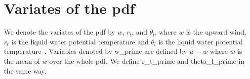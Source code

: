 \section{Variates of the pdf}\label{sec:variates-of-the-pdf}

We denote the variates of the \gls{pdf} by $w$, $r_t$, and $\theta_l$,
where $w$ is the upward wind, $r_t$ is the liquid water potential
temperature and $\theta_l$ is the liquid water potential temperature~\autocite[p. 10]{larson2022clubbsilhs}.
Variables denoted by \gls{w_prime} are defined by $w - \overline{w}$
where $\overline{w}$ is the mean of $w$ over the whole pdf.
We define \gls{r_t_prime} and \gls{theta_l_prime} in the same way.